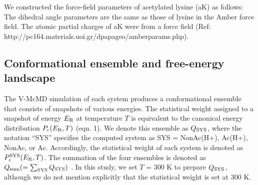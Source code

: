 We constructed the force-field parameters of acetylated lysine (aK) as follows: The dihedral angle parameters are the same as those of lysine in the Amber force field. The atomic partial charges of aK were from a force field (Ref: http://pc164.materials.uoi.gr/dpapageo/amberparams.php).

\subsection{Conformational ensemble and free-energy landscape}
The V-McMD simulation of each system produces a conformational ensemble that consists of snapshots of various energies. The statistical weight assigned to a snapshot of energy $E_{\rm R}$ at temperature $T$ is equivalent to the canonical energy distribution $P_{\rm c}(E_{\rm R}, T)$ (eqn. 1).  We denote this ensemble as $Q_{\rm SYS}$, where the notation “SYS” specifies the computed system as SYS = NonAc(H+), Ac(H+), NonAc, or Ac. Accordingly, the statistical weight of each system is denoted as $P^{\rm SYS}_{\rm c}(E_{\rm R}, T)$. The summation of the four ensembles is denoted as $Q_{\rm sum}(=\sum_{\rm SYS} Q_{\rm SYS})$ . In this study, we set $T$ = 300 K to prepare $Q_{\rm SYS}$, although we do not mention explicitly that the statistical weight is set at 300 K.

